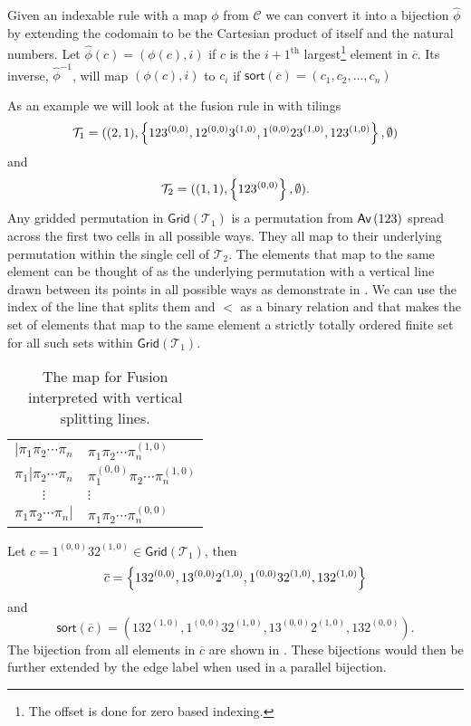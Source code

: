 Given an indexable rule with a map $\phi$ from $\mathcal{C}$ we can convert it into a bijection 
$\hat{\phi}$ by extending the codomain to be the Cartesian product of itself and the natural numbers. Let $\hat{\phi}(c) = (\phi(c),i)$ if $c$ is the $i+1^\text{th}$ largest\footnote{The offset is done for zero based indexing.} element in $\overline{c}$. Its inverse, $\hat{\phi}^{-1}$, will map $(\phi(c),i)$ to $c_i$ if $\textsf{sort}(\overline{c}) = (c_1,c_2,\dotsc,c_n)$

As an example we will look at the fusion rule in  with tilings
\[
    \mathcal{T}_1 = ((2,1), \left\{123^{(0,0)},12^{(0,0)}3^{(1,0)},1^{(0,0)}23^{(1,0)},123^{(1,0)}\right\}, \emptyset)
\]
and
\[
    \mathcal{T}_2 = ((1,1),\left\{123^{(0,0)}\right\}, \emptyset).
\]
Any gridded permutation in $\textsf{Grid}(\mathcal{T}_1)$ is a permutation from $\textsf{Av}\left(123\right)$ spread across the first two cells in all possible ways. They all map to their underlying permutation within the single cell of $\mathcal{T}_2$. The elements that map to the same element can be thought of as the underlying permutation with a vertical line drawn between its points in all possible ways as demonstrate in . We can use the index of the line that splits them and $<$ as a binary relation and that makes the set of elements that map to the same element a strictly totally ordered finite set for all such sets within $\textsf{Grid}(\mathcal{T}_1)$.

\begin{table}[ht!]
    \centering
    \begin{tabular}{c|l}
        $|\pi_1\pi_2\dotsm\pi_n$ & $\pi_1\pi_2\dotsm\pi_n^{(1,0)}$ \\
        $\pi_1|\pi_2\dotsm\pi_n$ & $\pi_1^{(0,0)}\pi_2\dotsm\pi_n^{(1,0)}$ \\
        $\vdots$ & \hspace{1cm}$\vdots$ \\
        $\pi_1\pi_2\dotsm\pi_n|$ & $\pi_1\pi_2\dotsm\pi_n^{(0,0)}$ \\
    \end{tabular}
    \caption{The map for Fusion interpreted with vertical splitting lines.}
    \label{tab:fuseline}
\end{table}

Let $c = 1^{(0,0)}32^{(1,0)} \in \textsf{Grid}(\mathcal{T}_1)$, then
\[
    \overline{c} = \left\{132^{(0,0)},13^{(0,0)}2^{(1,0)}, 1^{(0,0)}32^{(1,0)}, 132^{(1,0)}\right\}
\]
and 
\[
    \textsf{sort}(\overline{c}) = \left(132^{(1,0)},1^{(0,0)}32^{(1,0)},13^{(0,0)}2^{(1,0)},132^{(0,0)}\right).
\]
The bijection from all elements in $\overline{c}$ are shown in . These bijections would then be further extended by the edge label when used in a parallel bijection.

